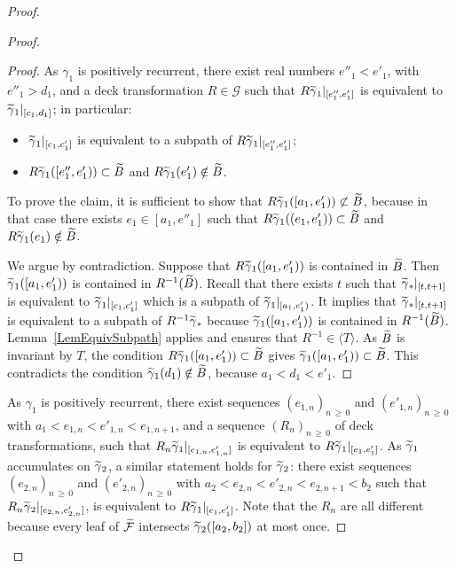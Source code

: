 \documentclass[10pt,a4paper]{article}
\theoremstyle{definition}
\theoremstyle{plain}
\numberwithin{equation}{section}
\numberwithin{figure}{section}
\newcommand{\G}{\mathcal{G}}
\newcommand{\F}{\mathcal{F}}
\let\oldtilde\tilde
\renewcommand*{\tilde}[1]{\mathchoice{\widetilde{#1}}{\widetilde{#1}}{\oldtilde{#1}}{\oldtilde{#1}}}
\begin{document}
\begin{proof}
\begin{proof}
\begin{proof}
As $\gamma_1$ is positively recurrent, there exist real numbers $e''_1<e'_1$, with $e''_1>d_1$, and a deck transformation $R\in\G$ such that $R\tilde\gamma_1|_{[e''_1,e'_1]}$ is equivalent to $\tilde\gamma_1|_{[c_1,d_1]}$; in particular:
\begin{itemize}
\item $\tilde\gamma_1|_{[c_1,c'_1]}$ is equivalent to a subpath of $R\tilde\gamma_1|_{[e''_1,e'_1]}$;
\item $R\tilde\gamma_1([e''_1,e'_1))\subset \tilde B$ and $R\tilde\gamma_1(e'_1)\notin \tilde B$.
\end{itemize}
To prove the claim, it is sufficient to show that $R\tilde\gamma_1([a_1,e'_1))\not\subset \tilde B$, because in that case there exists $e_1\in [a_1,e''_1]$ such that $R\tilde\gamma_1((e_1,e'_1))\subset \tilde B$ and $R\tilde\gamma_1(e_1)\notin \tilde B$.

We argue by contradiction. Suppose that $R\tilde\gamma_1([a_1,e'_1))$ is contained in $\tilde B$. Then $\tilde\gamma_1([a_1,e'_1))$ is contained in $R^{-1}(\tilde B)$. Recall that there exists $t$ such that $\tilde \gamma_*\vert_{[t,t+1]}$ is equivalent to $\tilde\gamma_1|_{[c_1, c'_1]}$ which is a subpath of $\tilde\gamma_1|_{[a_1,e'_1)}$. It implies that $\tilde \gamma_*\vert_{[t,t+1]}$ is equivalent to a subpath of $R^{-1}\tilde\gamma_*$ because $\tilde\gamma_1([a_1,e'_1))$ is contained in $R^{-1}(\tilde B)$. Lemma~\ref{LemEquivSubpath} applies and ensures that $R^{-1}\in\langle T\rangle$. As $\tilde B$ is invariant by $T$, the condition $R\tilde\gamma_1([a_1,e'_1))\subset \tilde B$ gives $\tilde\gamma_1([a_1,e'_1))\subset \tilde B$. This contradicts the condition $\tilde\gamma_1(d_1)\notin \tilde B$, because $a_1<d_1<e'_1$.
\end{proof}

As $\gamma_1$ is positively recurrent, there exist sequences $(e_{1,n})_{n\,\ge\,0}$ and $(e'_{1,n})_{n\,\ge\,0}$ with $a_1<e_{1,n}<e'_{1,n}<e_{1,n+1}$, and a sequence $(R_n)_{n\,\ge\,0}$ of deck transformations, such that $R_n \tilde\gamma_1|_{[e_{1,n},e'_{1,n}]}$ is equivalent to $R\tilde \gamma_1|_{[e_1,e'_1]}$. As $\tilde\gamma_1$ accumulates on $\tilde\gamma_2$, a similar statement holds for $\tilde\gamma_2$: there exist sequences $(e_{2,n})_{n\,\ge\,0}$ and $(e'_{2,n})_{n\,\ge\,0}$ with $a_2<e_{2,n}<e'_{2,n}<e_{2,n+1}<b_2$ such that $R_n \tilde\gamma_2|_{[e_{2,n},e'_{2,n}]}$, is equivalent to $R\tilde \gamma_1|_{[e_1,e'_1]}$. Note that the $R_n$ are all different because every leaf of $\tilde{\F}$ intersects $\tilde \gamma_2([a_2,b_2])$ at most once.


\end{proof}
\end{proof}
\end{document}
